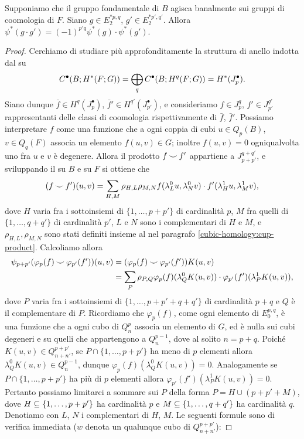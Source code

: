 \begin{proposition}
Supponiamo che il gruppo fondamentale di \(B\) agisca banalmente sui gruppi di coomologia di \(F\). Siano \(g\in E^{\ast p,q}_2\), \(g'\in E^{\ast p',q'}_2\). Allora \(\psi^*(g\cdot g')=(-1)^{p'q}\psi^*(g)\cdot\psi^*(g')\).
\end{proposition}
\begin{proof}
Cerchiamo di studiare più approfonditamente la struttura di anello indotta dal \cupproduct{} su 
\[
C^\bullet(B;H^*(F;G))=\bigoplus_qC^\bullet(B;H^q(F;G))=H^*(J^\bullet_p).
\]
Siano dunque \(\bar{f}\in H^q(J^\bullet_p)\), \(\bar{f}'\in H^{q'}(J^\bullet_{p'})\), e consideriamo \(f\in J^q_p\), \(f'\in J^{q'}_{p'}\) rappresentanti delle classi di coomologia rispettivamente di \(\bar{f}\), \(\bar{f}'\). Possiamo interpretare \(f\) come una funzione che a ogni coppia di cubi \(u\in Q_p(B)\), \(v\in Q_q(F)\) associa un elemento \(f(u,v)\in G\); inoltre \(f(u,v)=0\) ogniqualvolta uno fra \(u\) e \(v\) è degenere. Allora il prodotto \(f\mathbin{\smile} f'\) appartiene a \(J^{q+q'}_{p+p'}\), e sviluppando il \cupproduct{} su \(B\) e su \(F\) si ottiene che
\[
(f\mathbin{\smile} f')(u,v)=\sum_{H,M}\rho_{H,L}\rho_{M,N}f(\lambda^0_Lu,\lambda^0_Nv)\cdot f'(\lambda^1_Hu,\lambda^1_Mv),
\]
dove \(H\) varia fra i sottoinsiemi di \(\{1,\ldots,p+p'\}\) di cardinalità \(p\), \(M\) fra quelli di \(\{1,\ldots,q+q'\}\) di cardinalità \(p'\), \(L\) e \(N\) sono i complementari di \(H\) e \(M\), e \(\rho_{H,L},\rho_{M,N}\) sono stati definiti insieme al \cupproduct{} nel paragrafo \ref{cubic-homology:cup-product}. Calcoliamo allora
\begin{align*}
\psi_{p+p'}(\varphi_p(f)\mathbin{\smile}\varphi_{p'}(f'))(u,v)&=(\varphi_p(f)\mathbin{\smile}\varphi_{p'}(f'))K(u,v)\\
&=\sum_P\rho_{P,Q}\varphi_p(f)(\lambda^0_QK(u,v))\cdot\varphi_{p'}(f')(\lambda^1_PK(u,v)),
\end{align*}
dove \(P\) varia fra i sottoinsiemi di \(\{1,\ldots,p+p'+q+q'\}\) di cardinalità \(p+q\) e \(Q\) è il complementare di \(P\). Ricordiamo che \(\varphi_p(f)\), come ogni elemento di \(E^{p,q}_0\), è una funzione che a ogni cubo di \(Q^p_n\) associa un elemento di \(G\), ed è nulla sui cubi degeneri e su quelli che appartengono a \(Q^{p-1}_n\), dove al solito \(n=p+q\). Poiché \(K(u,v)\in Q^{p+p'}_{n+n'}\), se \(P\cap\{1,\ldots,p+p'\}\) ha meno di \(p\) elementi allora \(\lambda^0_QK(u,v)\in Q^{p-1}_{n}\), dunque \(\varphi_{p}(f)(\lambda^0_QK(u,v))=0\). Analogamente se \(P\cap\{1,\ldots,p+p'\}\) ha più di \(p\) elementi allora \(\varphi_{p'}(f')(\lambda^1_PK(u,v))=0\). Pertanto possiamo limitarci a sommare sui \(P\) della forma \(P=H\cup(p+p'+M)\), dove \(H\subseteq\{1,\ldots,p+p'\}\) ha cardinalità \(p\) e \(M\subseteq\{1,\ldots,q+q'\}\) ha cardinalità \(q\). Denotiamo con \(L\), \(N\) i complementari di \(H\), \(M\). Le seguenti formule sono di verifica immediata (\(w\) denota un qualunque cubo di \(Q^{p+p'}_{n+n'}\)):

\end{proof}
